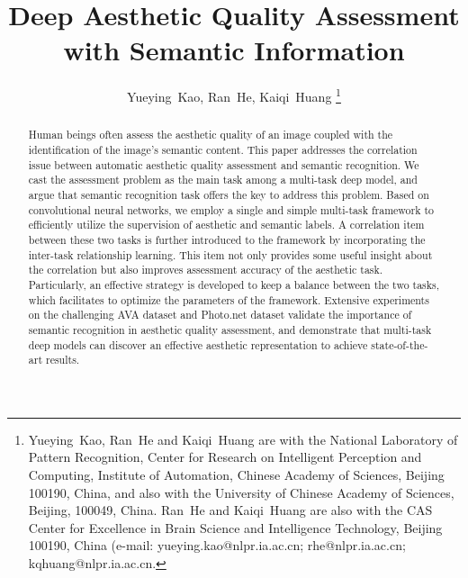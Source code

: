 \documentclass[journal]{IEEEtran}
\begin{document}
\title{Deep Aesthetic Quality Assessment with Semantic Information}


\author{
Yueying~Kao,
Ran~He,
Kaiqi~Huang
\thanks{Yueying~Kao, Ran~He and Kaiqi~Huang are with the National Laboratory of Pattern Recognition, Center for Research on Intelligent Perception and Computing, Institute of Automation, Chinese Academy of Sciences, Beijing 100190, China, and also with the University of Chinese Academy of Sciences, Beijing, 100049, China. Ran~He and Kaiqi~Huang are also with the CAS Center for Excellence in Brain Science and Intelligence Technology, Beijing 100190, China (e-mail: yueying.kao@nlpr.ia.ac.cn; rhe@nlpr.ia.ac.cn; kqhuang@nlpr.ia.ac.cn.}
}



















\maketitle

\begin{abstract}
  Human beings often assess the aesthetic quality of an image coupled with the identification of the image's semantic content. This paper addresses the correlation issue between automatic aesthetic quality assessment and semantic recognition. We cast the assessment problem as the main task among a multi-task deep model, and argue that semantic recognition task offers the key to address this problem. Based on convolutional neural networks, we employ a single and simple multi-task framework to efficiently utilize the supervision of aesthetic and semantic labels. A correlation item between these two tasks is further introduced to the framework by incorporating the inter-task relationship learning. This item not only provides some useful insight about the correlation but also improves assessment accuracy of the aesthetic task. Particularly, an effective strategy is developed to keep a balance between the two tasks, which facilitates to optimize the parameters of the framework. Extensive experiments on the challenging AVA dataset and Photo.net dataset validate the importance of semantic recognition in aesthetic quality assessment, and demonstrate that multi-task deep models can discover an effective aesthetic representation to achieve state-of-the-art results.
\end{abstract}
\end{document}
